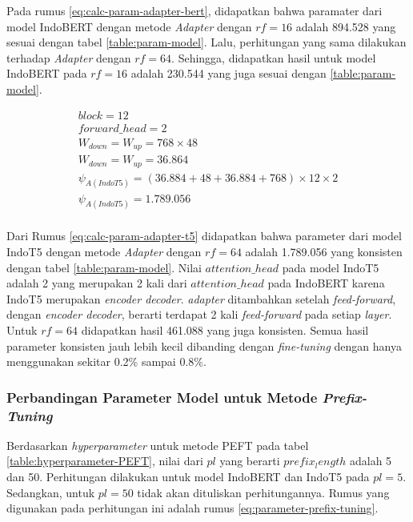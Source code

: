 Pada rumus \ref{eq:calc-param-adapter-bert}, didapatkan bahwa paramater dari model IndoBERT dengan metode \textit{Adapter} dengan $rf=16$ adalah 894.528 yang sesuai dengan tabel \ref{table:param-model}. Lalu, perhitungan yang sama dilakukan terhadap \textit{Adapter} dengan $rf=64$. Sehingga, didapatkan hasil untuk model IndoBERT pada $rf=16$ adalah 230.544 yang juga sesuai dengan \ref{table:param-model}. 

\begin{equation}
    \begin{aligned}
        block = 12 \\ 
        forward\_head = 2 \\
        W_{down} = W_{up} = 768 \times 48 \\
        W_{down} = W_{up} = 36.864 \\
        \psi_{A(IndoT5)} = (36.884 + 48 + 36.884 + 768) \times 12 \times 2 \\
        \psi_{A(IndoT5)} = 1.789.056 \\
    \end{aligned}
    \label{eq:calc-param-adapter-t5}
\end{equation}

Dari Rumus \ref{eq:calc-param-adapter-t5} didapatkan bahwa parameter dari model IndoT5 dengan metode \textit{Adapter} dengan $rf=64$ adalah 1.789.056 yang konsisten dengan tabel \ref{table:param-model}. Nilai $attention\_head$ pada model IndoT5 adalah 2 yang merupakan 2 kali dari $attention\_head$ pada IndoBERT karena IndoT5 merupakan \textit{encoder decoder}. \textit{adapter} ditambahkan setelah \textit{feed-forward}, dengan \textit{encoder decoder}, berarti terdapat 2 kali \textit{feed-forward} pada setiap \textit{layer}. Untuk $rf=64$ didapatkan hasil 461.088 yang juga konsisten. Semua hasil parameter konsisten jauh lebih kecil dibanding dengan \textit{fine-tuning} dengan hanya menggunakan sekitar 0.2\% sampai 0.8\%.

\subsubsection{Perbandingan Parameter Model untuk Metode \textit{Prefix-Tuning}}

Berdasarkan \textit{hyperparameter} untuk metode PEFT pada tabel \ref{table:hyperparameter-PEFT}, nilai dari $pl$ yang berarti $prefix_length$ adalah 5 dan 50. Perhitungan dilakukan untuk model IndoBERT dan IndoT5 pada $pl=5$. Sedangkan, untuk $pl=50$ tidak akan dituliskan perhitungannya. Rumus yang digunakan pada perhitungan ini adalah rumus \ref{eq:parameter-prefix-tuning}.

